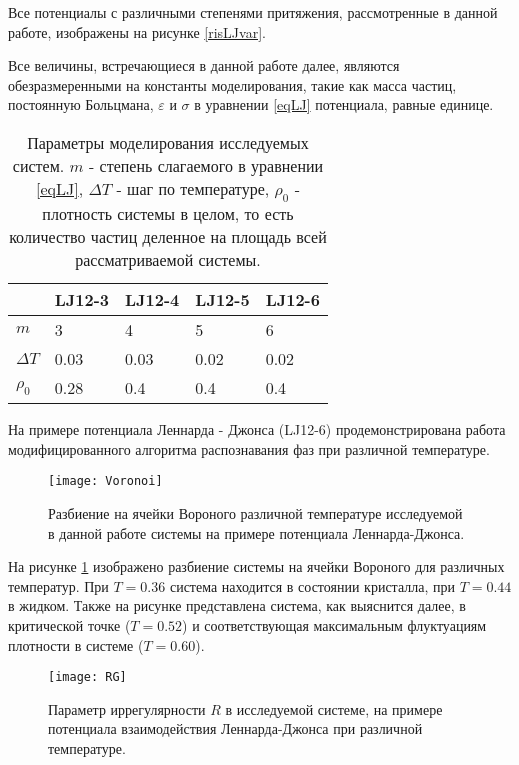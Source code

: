 Все потенциалы с различными степенями притяжения, рассмотренные в данной работе, изображены на рисунке \ref{risLJvar}.

Все величины, встречающиеся в данной работе далее, являются обезразмеренными на константы моделирования, такие как масса частиц, постоянную Больцмана, $\varepsilon$ и $\sigma$ в уравнении \ref{eqLJ} потенциала, равные единице.

\begin{table}[h]
\begin{center}
\begin{tabular}{| l | l | l | l | l |}
\hline
    & LJ12-3 & LJ12-4 & LJ12-5 & LJ12-6 \\ \hline
$m$   &    3    &     4   &    5    &    6    \\ \hline
$\Delta T$ & 0.03 & 0.03 & 0.02 & 0.02 \\ \hline
$\rho_0$ & 0.28  &  0.4  &  0.4  &  0.4  \\ \hline
\end{tabular}
\end{center}
\caption{Параметры моделирования исследуемых систем. $m$ - степень слагаемого в уравнении \ref{eqLJ}, $\Delta T$ - шаг по температуре,  $\rho_0$ - плотность системы в целом, то есть количество частиц деленное на площадь всей рассматриваемой системы.}
\label{tablParam}
\end{table}

На примере потенциала Леннарда - Джонса (LJ12-6) продемонстрирована работа модифицированного алгоритма распознавания фаз при различной температуре.

\begin{figure}[h]
\begin{center}
\texttt{[image: Voronoi]}
\caption{Разбиение на ячейки Вороного различной температуре исследуемой в данной работе системы на примере потенциала Леннарда-Джонса.}
\label{risvoronoiExp}
\end{center}
\end{figure}

На рисунке \ref{risvoronoiExp} изображено разбиение системы на ячейки Вороного для различных температур. При $T = 0.36$ система находится в состоянии кристалла, при $T = 0.44$ в жидком. Также на рисунке представлена система, как выяснится далее, в критической точке ($T = 0.52$) и соответствующая максимальным флуктуациям плотности в системе ($T = 0.60$).

\begin{figure}[h]
\begin{center}
\texttt{[image: RG]}
\caption{Параметр иррегулярности $R$ в исследуемой системе, на примере потенциала взаимодействия Леннарда-Джонса при различной температуре.}
\label{risIregExp}
\end{center}
\end{figure}


